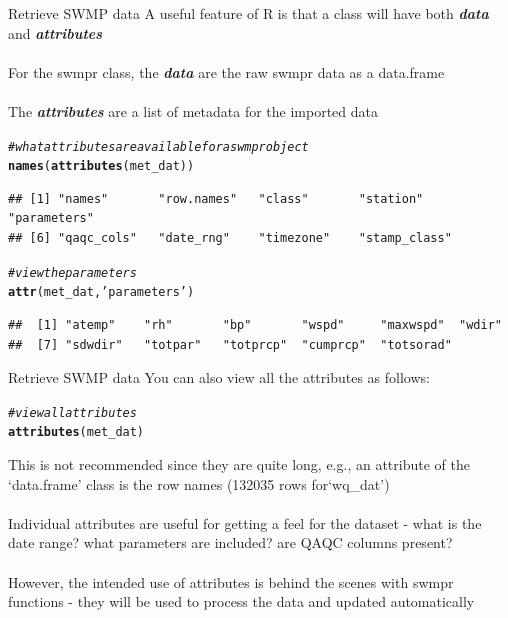 \documentclass[xcolor=svgnames]{beamer}\usepackage[]{graphicx}\usepackage[]{color}
\makeatletter
\newcommand{\hlstr}[1]{\textcolor[rgb]{0.192,0.494,0.8}{#1}}%
\newcommand{\hlcom}[1]{\textcolor[rgb]{0.678,0.584,0.686}{\textit{#1}}}%
\newcommand{\hlstd}[1]{\textcolor[rgb]{0.345,0.345,0.345}{#1}}%
\newcommand{\hlkwd}[1]{\textcolor[rgb]{0.737,0.353,0.396}{\textbf{#1}}}%
\newenvironment{kframe}{%
 \def\at@end@of@kframe{}%
 \ifinner\ifhmode%
  \def\at@end@of@kframe{\end{minipage}}%
  \begin{minipage}{\columnwidth}%
 \fi\fi%
 \def\FrameCommand##1{\hskip\@totalleftmargin \hskip-\fboxsep
 \colorbox{shadecolor}{##1}\hskip-\fboxsep
     \hskip-\linewidth \hskip-\@totalleftmargin \hskip\columnwidth}%
 \MakeFramed {\advance\hsize-\width
   \@totalleftmargin\z@ \linewidth\hsize
   \@setminipage}}%
 {\par\unskip\endMakeFramed%
 \at@end@of@kframe}
\newenvironment{knitrout}{}{} %
\newcommand{\Bigtxt}[1]{\textbf{\textit{#1}}}
\makeatother
\begin{document}
\begin{frame}{Retrieve SWMP data}
A useful feature of R is that a class will have both \Bigtxt{data} and \Bigtxt{attributes}\\~\\
For the swmpr class, the \Bigtxt{data} are the raw swmpr data as a data.frame \\~\\
The \Bigtxt{attributes} are a list of metadata for the imported data
\begin{knitrout}\scriptsize
{}\color{fgcolor}\begin{kframe}
\begin{alltt}
\hlcom{# what attributes are available for a swmpr object}
\hlkwd{names}\hlstd{(}\hlkwd{attributes}\hlstd{(met_dat))}
\end{alltt}
\begin{verbatim}
## [1] "names"       "row.names"   "class"       "station"     "parameters" 
## [6] "qaqc_cols"   "date_rng"    "timezone"    "stamp_class"
\end{verbatim}
\begin{alltt}
\hlcom{# view the parameters}
\hlkwd{attr}\hlstd{(met_dat,} \hlstr{'parameters'}\hlstd{)}
\end{alltt}
\begin{verbatim}
##  [1] "atemp"    "rh"       "bp"       "wspd"     "maxwspd"  "wdir"    
##  [7] "sdwdir"   "totpar"   "totprcp"  "cumprcp"  "totsorad"
\end{verbatim}
\end{kframe}
\end{knitrout}
\end{frame}

\begin{frame}[containsverbatim]{Retrieve SWMP data}
You can also view all the attributes as follows:
\begin{knitrout}\scriptsize
{}\color{fgcolor}\begin{kframe}
\begin{alltt}
\hlcom{# view all attributes}
\hlkwd{attributes}\hlstd{(met_dat)}
\end{alltt}
\end{kframe}
\end{knitrout}
This is not recommended since they are quite long, e.g., an attribute of the `data.frame' class is the row names (132035 rows for`wq\_dat') \\~\\
Individual attributes are useful for getting a feel for the dataset - what is the date range? what parameters are included? are QAQC columns present? \\~\\
However, the intended use of attributes is behind the scenes with swmpr functions - they will be used to process the data and updated automatically
\end{frame}
\end{document}
